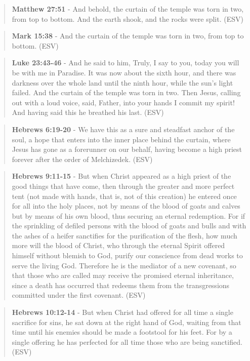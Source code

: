 \documentclass[11pt]{article}
\begin{document}
\begin{quote}
\textbf{Matthew 27:51} - And behold, the curtain of the temple was torn in two, from top to bottom. And the earth shook, and the rocks were split. (ESV)
\end{quote}

\begin{quote}
\textbf{Mark 15:38} - And the curtain of the temple was torn in two, from top to bottom. (ESV)
\end{quote}

\begin{quote}
\textbf{Luke 23:43-46} - And he said to him, Truly, I say to you, today you will be with me in Paradise. It was now about the sixth hour, and there was darkness over the whole land until the ninth hour, while the sun's light failed. And the curtain of the temple was torn in two. Then Jesus, calling out with a loud voice, said, Father, into your hands I commit my spirit! And having said this he breathed his last. (ESV)
\end{quote}

\begin{quote}
\textbf{Hebrews 6:19-20} - We have this as a sure and steadfast anchor of the soul, a hope that enters into the inner place behind the curtain, where Jesus has gone as a forerunner on our behalf, having become a high priest forever after the order of Melchizedek. (ESV)
\end{quote}

\begin{quote}
\textbf{Hebrews 9:11-15} - But when Christ appeared as a high priest of the good things that have come, then through the greater and more perfect tent (not made with hands, that is, not of this creation) he entered once for all into the holy places, not by means of the blood of goats and calves but by means of his own blood, thus securing an eternal redemption. For if the sprinkling of defiled persons with the blood of goats and bulls and with the ashes of a heifer sanctifies for the purification of the flesh, how much more will the blood of Christ, who through the eternal Spirit offered himself without blemish to God, purify our conscience from dead works to serve the living God. Therefore he is the mediator of a new covenant, so that those who are called may receive the promised eternal inheritance, since a death has occurred that redeems them from the transgressions committed under the first covenant. (ESV)
\end{quote}

\begin{quote}
\textbf{Hebrews 10:12-14} - But when Christ had offered for all time a single sacrifice for sins, he sat down at the right hand of God, waiting from that time until his enemies should be made a footstool for his feet. For by a single offering he has perfected for all time those who are being sanctified. (ESV)
\end{quote}
\end{document}
